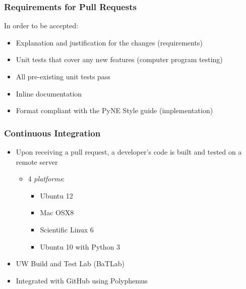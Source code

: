 \documentclass[12pt]{beamer}
\begin{document}
\begin{frame}
\frametitle{Requirements for Pull Requests}

In order to be accepted:

\begin{itemize}
\item{Explanation and justification for the changes (\alert{requirements})}
\item{Unit tests that cover any new features (\alert{computer program testing})}
\item{All pre-existing unit tests pass}
\item{Inline documentation}
\item{Format compliant with the PyNE Style guide (\alert{implementation})}
\end{itemize}

\end{frame}

\begin{frame}
\frametitle{Continuous Integration \cite{beck1998extreme}}

\begin{itemize}
\item{Upon receiving a pull request, a developer's code is built and tested on a remote server}
    \begin{itemize}
    \item{4 \emph{platforms}:}
        \begin{itemize}
        \item{Ubuntu 12}
        \item{Mac OSX8}
        \item{Scientific Linux 6}
        \item{Ubuntu 10 with Python 3}
        \end{itemize}
    \end{itemize}
\item{UW Build and Test Lab (BaTLab) \cite{batlab_2014}}
\item{Integrated with GitHub using Polyphemus \cite{polyphemus_2014}}
\end{itemize}
\end{frame}
\end{document}
